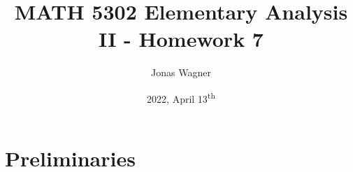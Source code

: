 \documentclass[]{article}
\title{MATH 5302 Elementary Analysis II - Homework 7}
\author{Jonas Wagner}
\date{2022, April 13\textsuperscript{th}}
\newcommand{\R}{\mathbb{R}}
\newtheorem{definition}{Definition}
\begin{document}
\maketitle

\section*{Preliminaries}

\end{document}
